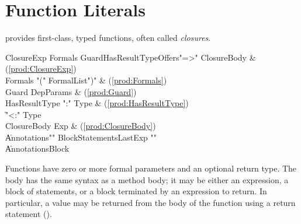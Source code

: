 %


\section{Function Literals}
\label{FunctionLiteral}

\Xten{} provides first-class, typed functions, often called {\em closures}.

\begin{bbgrammar}
          ClosureExp \: Formals Guard\opt HasResultType\opt Offers\opt \xcd"=>" ClosureBody & (\ref{prod:ClosureExp}) \\
             Formals \: \xcd"(" FormalList\opt \xcd")" & (\ref{prod:Formals}) \\
               Guard \: DepParams & (\ref{prod:Guard}) \\
       HasResultType \: \xcd":" Type & (\ref{prod:HasResultType}) \\
                     \| \xcd"<:" Type \\
         ClosureBody \: Exp & (\ref{prod:ClosureBody}) \\
                     \| Annotations\opt \xcd"{" BlockStatements\opt LastExp \xcd"}" \\
                     \| Annotations\opt Block \\
\end{bbgrammar}

Functions have zero or more formal parameters and an optional return type.
The body has the 
same syntax as a method body; it may be either an expression, a block
of statements, or a block terminated by an expression to return. In
particular, a value may be returned from the body of the function
using a return statement (). 

